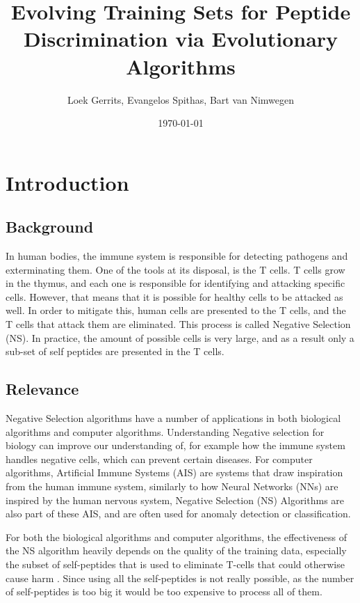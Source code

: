 \documentclass{article}
\title{Evolving Training Sets for Peptide Discrimination via Evolutionary Algorithms}
\author{Loek Gerrits, Evangelos Spithas, Bart van Nimwegen}
\date{\today}
\begin{document}
 

\maketitle

\section{Introduction}

\subsection{Background}

In human bodies, the immune system is responsible for detecting pathogens and exterminating them. 
One of the tools at its disposal, is the T cells. T cells grow in the thymus, and each one is responsible for
identifying and attacking specific cells. However, that means that it is possible for healthy cells to be
attacked as well. In order to mitigate this, human cells are presented to the T cells, and the T cells that attack them 
are eliminated. This process is called Negative Selection (NS). In practice, the amount of possible cells is very large, and as a result only a sub-set of self peptides are presented
in the T cells. 

\subsection{Relevance}
Negative Selection algorithms have a number of  applications in both biological algorithms and computer algorithms.
Understanding Negative selection for biology can improve our understanding of, for example how the immune system handles
negative cells, which can prevent certain diseases. For computer algorithms, Artificial Immune Systems (AIS) are systems
that draw inspiration from the human immune system, similarly to how Neural Networks (NNs) are inspired by the human 
nervous system, Negative Selection (NS) Algorithms are also part of these AIS, and are often used for anomaly detection 
or classification.

For both the biological algorithms and computer algorithms, the effectiveness of the NS algorithm heavily depends
on the quality of the training data, especially the subset of self-peptides that is used to eliminate T-cells that
could otherwise cause harm . Since using all the self-peptides is not really possible,
as the number of self-peptides is too big it would be too expensive to process all of them.
\end{document}
